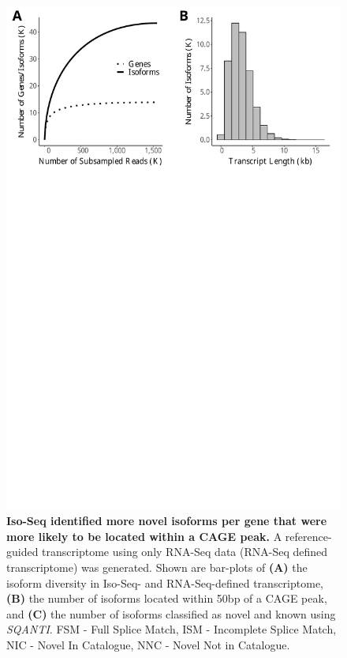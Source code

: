 \begin{figure}[htp]
	\begin{center}
		\includegraphics[page=9,trim={0 13cm 0 0},scale = 0.55]{Figures/IsoSeqWholeTranscriptome.pdf}
	\end{center}
	\captionsetup{width=0.95\textwidth}
	\caption[Comparison of Iso-Seq-defined and RNA-Seq-defined transcriptome]%
	{\textbf{Iso-Seq identified more novel isoforms per gene that were more likely to be located within a CAGE peak.} A reference-guided transcriptome using only RNA-Seq data (RNA-Seq defined transcriptome) was generated. Shown are bar-plots of \textbf{(A)} the isoform diversity in Iso-Seq- and RNA-Seq-defined transcriptome, \textbf{(B)} the number of isoforms located within 50bp of a CAGE peak, and \textbf{(C)} the number of isoforms classified as novel and known using \textit{SQANTI}. FSM - Full Splice Match, ISM - Incomplete Splice Match, NIC - Novel In Catalogue, NNC - Novel Not in Catalogue.}   
	\label{fig:isoseq_whole_rnaseqvsisoseq}
\end{figure}

